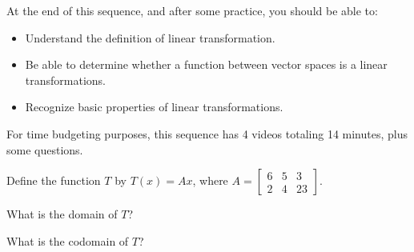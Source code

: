 




At the end of this sequence, and after some practice, you should be able to:

\begin{itemize}
\item Understand the definition of linear transformation.  
\item Be able to determine whether a function between vector spaces is a linear transformations. 
\item Recognize basic properties of linear transformations.
\end{itemize}

For time budgeting purposes, this sequence has 4 videos totaling 14 minutes, 
plus some questions.  



\endedxtext

\endedxvertical







Define the function $T$ by $T(x) = Ax$, where $A = \left[ \begin{array}{ccc}
6 & 5 & 3 \\
2 & 4 &  23 
\end{array} \right].$

What is the domain of $T$?


What is the codomain of $T$?



\endedxproblem



